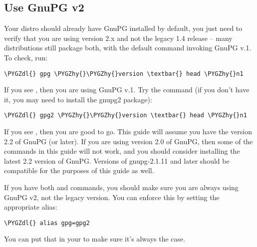 \documentclass[a4paper,8pt,english]{sphinxmanual}
\def\PYGZdl{\char`\$}
\def\PYGZhy{\char`\-}
\begin{document}
\subsection{Use GnuPG v2}
\label{process/maintainer-pgp-guide:use-gnupg-v2}
Your distro should already have GnuPG installed by default, you just
need to verify that you are using version 2.x and not the legacy 1.4
release -- many distributions still package both, with the default
 command invoking GnuPG v.1. To check, run:

\begin{Verbatim}[commandchars=\\\{\}]
\PYGZdl{} gpg \PYGZhy{}\PYGZhy{}version \textbar{} head \PYGZhy{}n1
\end{Verbatim}

If you see , then you are using GnuPG v.1. Try the
 command (if you don't have it, you may need to install the
gnupg2 package):

\begin{Verbatim}[commandchars=\\\{\}]
\PYGZdl{} gpg2 \PYGZhy{}\PYGZhy{}version \textbar{} head \PYGZhy{}n1
\end{Verbatim}

If you see , then you are good to go. This guide
will assume you have the version 2.2 of GnuPG (or later). If you are
using version 2.0 of GnuPG, then some of the commands in this guide will
not work, and you should consider installing the latest 2.2 version of
GnuPG. Versions of gnupg-2.1.11 and later should be compatible for the
purposes of this guide as well.

If you have both  and  commands, you should make sure you
are always using GnuPG v2, not the legacy version. You can enforce this
by setting the appropriate alias:

\begin{Verbatim}[commandchars=\\\{\}]
\PYGZdl{} alias gpg=gpg2
\end{Verbatim}

You can put that in your  to make sure it's always the case.
\end{document}
